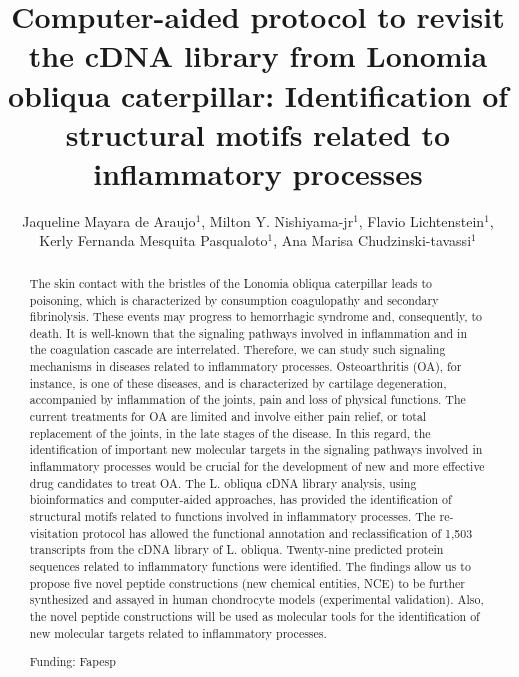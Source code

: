 \documentclass[twoside]{article}
\title{\vspace{-15mm}\fontsize{24pt}{10pt}\selectfont\textbf{Computer-aided protocol to revisit the cDNA library from Lonomia obliqua caterpillar: Identification of structural motifs related to inflammatory processes}} %
\author{Jaqueline Mayara de Araujo$^1$, Milton Y. Nishiyama-jr$^1$, Flavio Lichtenstein$^1$, Kerly Fernanda Mesquita Pasqualoto$^1$, Ana Marisa Chudzinski-tavassi$^1$}
\affil{1 INSTITUTO BUTANTAN\\ }
\date{}
\begin{document}
\maketitle %

\thispagestyle{fancy} %


\begin{abstract}
The skin contact with the bristles of the Lonomia obliqua  caterpillar leads to poisoning, which is characterized by consumption coagulopathy and secondary fibrinolysis. These events may progress to hemorrhagic syndrome and, consequently, to death. It is well-known that the signaling pathways involved in inflammation and in the coagulation cascade are interrelated. Therefore, we can study such signaling mechanisms in diseases related to inflammatory processes. Osteoarthritis (OA), for instance, is one of these diseases, and is characterized by cartilage degeneration, accompanied by inflammation of the joints, pain and loss of physical functions. The current treatments for OA are limited and involve either pain relief, or total replacement of the joints, in the late stages of the disease. In this regard, the identification of important new molecular targets in the signaling pathways involved in inflammatory processes would be crucial for the development of new and more effective drug candidates to treat OA. The L. obliqua cDNA library analysis, using bioinformatics and computer-aided approaches, has provided the identification of structural motifs related to functions involved in inflammatory processes. The re-visitation protocol has allowed the functional annotation and reclassification of 1,503 transcripts from the cDNA library of L. obliqua. Twenty-nine predicted protein sequences related to inflammatory functions were identified. The findings allow us to propose five novel peptide constructions (new chemical entities, NCE) to be further synthesized and assayed in human chondrocyte models (experimental validation). Also, the novel peptide constructions will be used as molecular tools for the identification of new molecular targets related to inflammatory processes.

Funding: Fapesp
\end{abstract}
\end{document}
